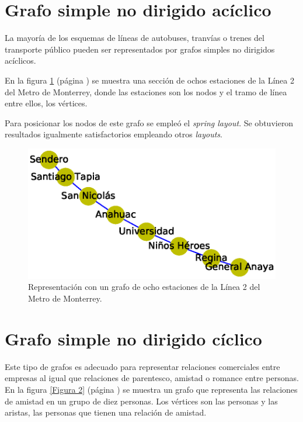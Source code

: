 \documentclass{article}
\begin{document}
\section{Grafo simple no dirigido acíclico}

La mayoría de los esquemas de líneas de autobuses, tranvías o trenes del transporte público pueden ser representados por grafos simples no dirigidos acíclicos.

En la figura  \ref{Figura 1} (página \pageref{Figura 1}) se muestra una sección de ochos estaciones de la Línea 2 del Metro de Monterrey, donde las estaciones son los nodos y el tramo de línea entre ellos, los vértices. 

Para posicionar los nodos de este grafo se empleó el \textit{spring layout}. Se obtuvieron resultados igualmente satisfactorios empleando otros \textit{layouts}.

\begin{figure}
\begin{center}
  \includegraphics[width=.7\columnwidth]{fig1.eps}
  
   \end{center}
   \vspace*{-20mm}
  \caption{Representación con un grafo de ocho estaciones de la Línea 2 del Metro de Monterrey.}
  \label{Figura 1}
 
\end{figure}



\section{Grafo simple no dirigido cíclico}

Este tipo de grafos es adecuado para representar relaciones comerciales entre empresas al igual que relaciones de parentesco, amistad o romance entre personas.
En la figura \ref{Figura 2} (página \pageref{Figura 2}) se muestra un grafo que representa las relaciones de amistad en un grupo de diez personas. Los vértices son las personas y las aristas, las personas que tienen una relación de amistad.
\end{document}
